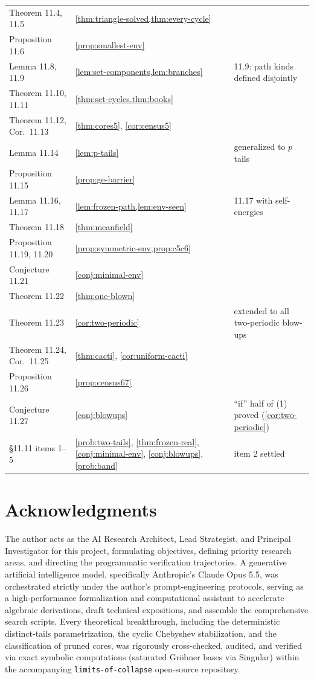 \documentclass[final]{siamart0516}
\numberwithin{theorem}{section}
\numberwithin{equation}{section}
\theoremstyle{siamnonum}
\theoremstyle{plain}
\newcommand{\code}[1]{{\ttfamily\nolinkurl{#1}}}
\begin{document}
\begin{center}
\begin{longtable}{@{}L{0.29}L{0.33}L{0.31}@{}}
Theorem 11.4, 11.5 & \cref{thm:triangle-solved,thm:every-cycle} & \\
Proposition 11.6 & \cref{prop:smallest-env} & \\
Lemma 11.8, 11.9 & \cref{lem:set-components,lem:branches} & 11.9: path kinds defined disjointly\\
Theorem 11.10, 11.11 & \cref{thm:set-cycles,thm:books} & \\
Theorem 11.12, Cor.\ 11.13 & \cref{thm:cores5}, \cref{cor:census5} & \\
Lemma 11.14 & \cref{lem:p-tails} & generalized to $p$ tails\\
Proposition 11.15 & \cref{prop:ge-barrier} & \\
Lemma 11.16, 11.17 & \cref{lem:frozen-path,lem:env-seen} & 11.17 with self-energies\\
Theorem 11.18 & \cref{thm:meanfield} & \\
Proposition 11.19, 11.20 & \cref{prop:symmetric-env,prop:c5c6} & \\
Conjecture 11.21 & \cref{conj:minimal-env} & \\
Theorem 11.22 & \cref{thm:one-blown} & \\
Theorem 11.23 & \cref{cor:two-periodic} & extended to all two-periodic blow-ups\\
Theorem 11.24, Cor.\ 11.25 & \cref{thm:cacti}, \cref{cor:uniform-cacti} & \\
Proposition 11.26 & \cref{prop:census67} & \\
Conjecture 11.27 & \cref{conj:blowups} & ``if'' half of (1) proved (\cref{cor:two-periodic})\\
\S11.11 items 1--5 & \cref{prob:two-tails}, \cref{thm:frozen-real}, \cref{conj:minimal-env}, \cref{conj:blowups}, \cref{prob:band} & item 2 settled\\
\bottomrule
\end{longtable}
\end{center}


\section*{Acknowledgments}
The author acts as the AI Research Architect, Lead Strategist, and Principal Investigator for this project, formulating objectives, defining priority research areas, and directing the programmatic verification trajectories. A generative artificial intelligence model, specifically Anthropic's Claude Opus 5.5, was orchestrated strictly under the author's prompt-engineering protocols, serving as a high-performance formalization and computational assistant to accelerate algebraic derivations, draft technical expositions, and assemble the comprehensive search scripts. Every theoretical breakthrough, including the deterministic distinct-tails parametrization, the cyclic Chebyshev stabilization, and the classification of pruned cores, was rigorously cross-checked, audited, and verified via exact symbolic computations (saturated Gr{\"o}bner bases via Singular) within the accompanying \code{limits-of-collapse} open-source repository.
\end{document}

